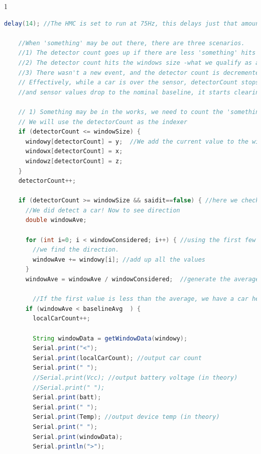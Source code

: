 \documentclass[11pt, oneside, fullpage, doublespace]{article}
\begin{document}
\begin{spacing}{1}
\begin{lstlisting}[language=java]
    delay(14); //The HMC is set to run at 75Hz, this delays just that amount!

    //When 'something' may be out there, there are three scenarios.  
    //1) The detector count goes up if there are less 'something' hits than the window size,
    //2) The detector count hits the windows size -what we qualify as a true car over the sensor!- and as such reports it,
    //3) There wasn't a new event, and the detector count is decremented.  Once it hits zero, the car is thought to have passed the sensor
    // Effectively, while a car is over the sensor, detectorCount stops counting, and sort of cruises at the max window size.  As the car passes
    //and sensor values drop to the nominal baseline, it starts clearing the detectorCount buffer and readies for a new car.

    // 1) Something may be in the works, we need to count the 'something' events to be sure and store it in the window
    // We will use the detectorCount as the indexer
    if (detectorCount <= windowSize) {
      windowy[detectorCount] = y;  //We add the current value to the window, for analysis later
      windowx[detectorCount] = x;
      windowz[detectorCount] = z;
    }
    detectorCount++;  

    if (detectorCount >= windowSize && saidit==false) { //here we check to see if we have detected enough events
      //We did detect a car! Now to see direction
      double windowAve;

      for (int i=0; i < windowConsidered; i++) { //using the first few values of the window (the orignal direction of the Magfield)
        //we find the direction.
        windowAve += windowy[i]; //add up all the values
      }
      windowAve = windowAve / windowConsidered;  //generate the average value to be used

        //If the first value is less than the average, we have a car heading in! So transmit!
      if (windowAve < baselineAvg  ) {
        localCarCount++;   
      
        String windowData = getWindowData(windowy);
        Serial.print("<");
        Serial.print(localCarCount); //output car count
        Serial.print(" ");
        //Serial.print(Vcc); //output battery voltage (in theory)
        //Serial.print(" ");
        Serial.print(batt);
        Serial.print(" ");
        Serial.print(Temp); //output device temp (in theory)
        Serial.print(" ");
        Serial.print(windowData);
        Serial.println(">");
        

\end{lstlisting}
\end{spacing}
\end{document}
